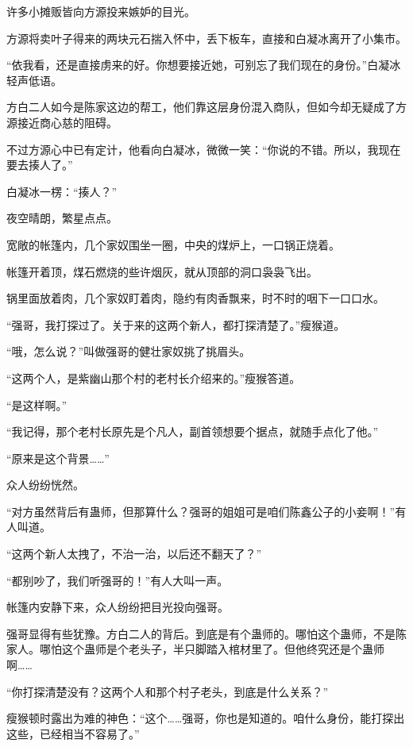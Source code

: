 
\begin{this_body}



许多小摊贩皆向方源投来嫉妒的目光。

方源将卖叶子得来的两块元石揣入怀中，丢下板车，直接和白凝冰离开了小集市。

“依我看，还是直接虏来的好。你想要接近她，可别忘了我们现在的身份。”白凝冰轻声低语。

方白二人如今是陈家这边的帮工，他们靠这层身份混入商队，但如今却无疑成了方源接近商心慈的阻碍。

不过方源心中已有定计，他看向白凝冰，微微一笑：“你说的不错。所以，我现在要去揍人了。”

白凝冰一楞：“揍人？”

夜空晴朗，繁星点点。

宽敞的帐篷内，几个家奴围坐一圈，中央的煤炉上，一口锅正烧着。

帐篷开着顶，煤石燃烧的些许烟灰，就从顶部的洞口袅袅飞出。

锅里面放着肉，几个家奴盯着肉，隐约有肉香飘来，时不时的咽下一口口水。

“强哥，我打探过了。关于来的这两个新人，都打探清楚了。”瘦猴道。

“哦，怎么说？”叫做强哥的健壮家奴挑了挑眉头。

“这两个人，是紫幽山那个村的老村长介绍来的。”瘦猴答道。

“是这样啊。”

“我记得，那个老村长原先是个凡人，副首领想要个据点，就随手点化了他。”

“原来是这个背景……”

众人纷纷恍然。

“对方虽然背后有蛊师，但那算什么？强哥的姐姐可是咱们陈鑫公子的小妾啊！”有人叫道。

“这两个新人太拽了，不治一治，以后还不翻天了？”

“都别吵了，我们听强哥的！”有人大叫一声。

帐篷内安静下来，众人纷纷把目光投向强哥。

强哥显得有些犹豫。方白二人的背后。到底是有个蛊师的。哪怕这个蛊师，不是陈家人。哪怕这个蛊师是个老头子，半只脚踏入棺材里了。但他终究还是个蛊师啊……

“你打探清楚没有？这两个人和那个村子老头，到底是什么关系？”

瘦猴顿时露出为难的神色：“这个……强哥，你也是知道的。咱什么身份，能打探出这些，已经相当不容易了。”


\end{this_body}

